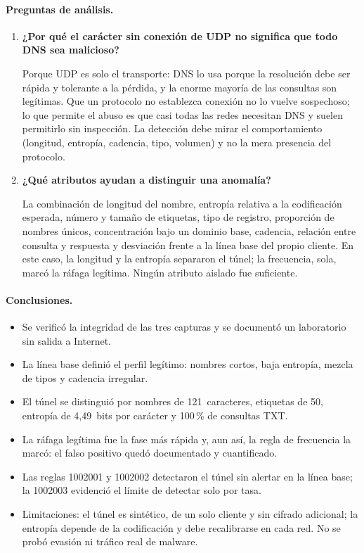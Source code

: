 \paragraph{Preguntas de análisis.}
\begin{enumerate}
	\item \textbf{¿Por qué el carácter sin conexión de UDP no significa que todo DNS sea malicioso?}\par
	Porque UDP es solo el transporte: DNS lo usa porque la resolución debe ser rápida y tolerante a la pérdida, y la enorme mayoría de las consultas son legítimas. Que un protocolo no establezca conexión no lo vuelve sospechoso; lo que permite el abuso es que casi todas las redes necesitan DNS y suelen permitirlo sin inspección. La detección debe mirar el comportamiento (longitud, entropía, cadencia, tipo, volumen) y no la mera presencia del protocolo.
	\item \textbf{¿Qué atributos ayudan a distinguir una anomalía?}\par
	La combinación de longitud del nombre, entropía relativa a la codificación esperada, número y tamaño de etiquetas, tipo de registro, proporción de nombres únicos, concentración bajo un dominio base, cadencia, relación entre consulta y respuesta y desviación frente a la línea base del propio cliente. En este caso, la longitud y la entropía separaron el túnel; la frecuencia, sola, marcó la ráfaga legítima. Ningún atributo aislado fue suficiente.
\end{enumerate}

\paragraph{Conclusiones.}
\begin{itemize}
	\item Se verificó la integridad de las tres capturas y se documentó un laboratorio sin salida a Internet.
	\item La línea base definió el perfil legítimo: nombres cortos, baja entropía, mezcla de tipos y cadencia irregular.
	\item El túnel se distinguió por nombres de 121~caracteres, etiquetas de 50, entropía de 4,49~bits por carácter y 100\,\% de consultas TXT.
	\item La ráfaga legítima fue la fase más rápida y, aun así, la regla de frecuencia la marcó: el falso positivo quedó documentado y cuantificado.
	\item Las reglas 1002001 y 1002002 detectaron el túnel sin alertar en la línea base; la 1002003 evidenció el límite de detectar solo por tasa.
	\item Limitaciones: el túnel es sintético, de un solo cliente y sin cifrado adicional; la entropía depende de la codificación y debe recalibrarse en cada red. No se probó evasión ni tráfico real de malware.
\end{itemize}

